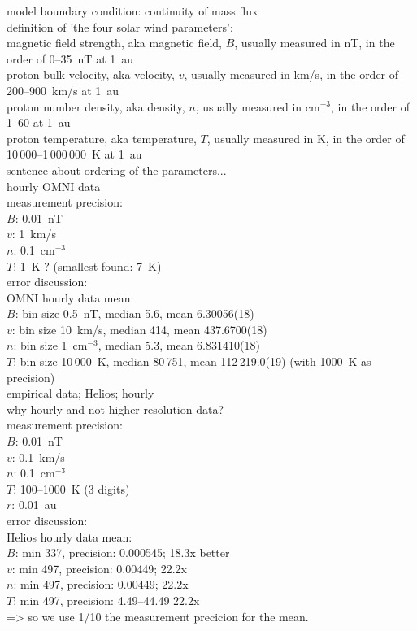 model boundary condition: continuity of mass flux\\

definition of 'the four solar wind parameters':\\	%
	magnetic field strength, aka magnetic field, $B$, usually measured in nT, in the order of 0--35~nT at 1~au\\
	proton bulk velocity, aka velocity, $v$, usually measured in km/s, in the order of 200--900~km/s at 1~au\\
	proton number density, aka density, $n$, usually measured in cm$^{-3}$, in the order of 1--60 at 1~au\\
	proton temperature, aka temperature, $T$, usually measured in K, in the order of 10\,000--1\,000\,000~K at 1~au\\
sentence about ordering of the parameters...\\

hourly OMNI data\\
measurement precision:\\
$B$: 0.01~nT\\
$v$: 1~km/s\\
$n$: 0.1~cm$^{-3}$\\
$T$: 1~K ? (smallest found: 7~K)\\

error discussion:\\
OMNI hourly data mean:\\
$B$: bin size 0.5~nT, median 5.6, mean 6.30056(18)\\
$v$: bin size 10~km/s, median 414, mean 437.6700(18)\\
$n$: bin size 1~cm$^{-3}$, median 5.3, mean 6.831410(18)\\
$T$: bin size 10\,000~K, median 80\,751, mean 112\,219.0(19) (with 1000~K as precision)\\

empirical data; Helios; hourly\\
why hourly and not higher resolution data?\\
measurement precision:\\
$B$: 0.01~nT\\
$v$: 0.1~km/s\\
$n$: 0.1~cm$^{-3}$\\
$T$: 100--1000~K (3 digits)\\
$r$: 0.01~au\\

error discussion:\\
Helios hourly data mean:\\
$B$: min 337, precision: 0.000545; 18.3x better\\
$v$: min 497, precision: 0.00449; 22.2x\\
$n$: min 497, precision:  0.00449; 22.2x\\
$T$: min 497, precision: 4.49--44.49 22.2x\\
=> so we use 1/10 the measurement precicion for the mean.\\

